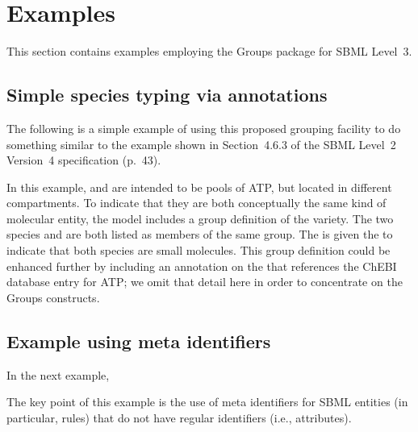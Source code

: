 
\section{Examples}
\label{examples}

This section contains examples employing the Groups package for SBML Level~3.

\subsection{Simple species typing via annotations}
\label{examples-speciestype}

The following is a simple example of using this proposed grouping facility to do something similar to the \SpeciesType example shown in Section~4.6.3 of the SBML Level~2 Version~4 specification (p.~43).

%


In this example,   and  are intended to be pools of ATP, but located in different compartments.  To indicate that they are both conceptually the same kind of molecular entity, the model includes a group definition of the  variety.  The two species  and  are both listed as members of the same group.  The \ListOfMembers is given the   to indicate that both species are small molecules.
This group definition could be enhanced further by including an annotation on the \ListOfMembers that references the ChEBI database entry for ATP; we omit that detail here in order to concentrate on the Groups constructs.


\subsection{Example using meta identifiers}

In the next example, 


The key point of this example is the use of meta identifiers for SBML entities (in particular, rules) that do not have regular identifiers (i.e.,  attributes).
